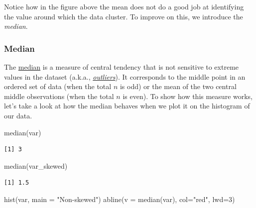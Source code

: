 \documentclass[
  letterpaper,
  DIV=11,
  numbers=noendperiod]{scrartcl}
\newenvironment{Shaded}{\begin{snugshade}}{\end{snugshade}}
\newcommand{\AttributeTok}[1]{\textcolor[rgb]{0.40,0.45,0.13}{#1}}
\newcommand{\DecValTok}[1]{\textcolor[rgb]{0.68,0.00,0.00}{#1}}
\newcommand{\FunctionTok}[1]{\textcolor[rgb]{0.28,0.35,0.67}{#1}}
\newcommand{\NormalTok}[1]{\textcolor[rgb]{0.00,0.23,0.31}{#1}}
\newcommand{\StringTok}[1]{\textcolor[rgb]{0.13,0.47,0.30}{#1}}
\begin{document}
Notice how in the figure above the mean does not do a good job at
identifying the value around which the data cluster. To improve on this,
we introduce the \emph{median}.

\subsubsection{Median}\label{median}

The
\href{https://www.khanacademy.org/math/statistics-probability/summarizing-quantitative-data/mean-median-basics/a/mean-median-and-mode-review\#:~:text=Median\%3A\%20The\%20middle\%20number\%3B\%20found,mean\%20of\%20those\%20two\%20numbers}{median}
is a measure of central tendency that is not sensitive to extreme values
in the dataset (a.k.a.,
\href{https://en.wikipedia.org/wiki/Outlier}{\emph{outliers}}). It
corresponds to the middle point in an ordered set of data (when the
total \(n\) is odd) or the mean of the two central middle observations
(when the total \(n\) is even). To show how this measure works, let's
take a look at how the median behaves when we plot it on the histogram
of our data.

\begin{Shaded}
\begin{Highlighting}[]
\FunctionTok{median}\NormalTok{(var)}
\end{Highlighting}
\end{Shaded}

\begin{verbatim}
[1] 3
\end{verbatim}

\begin{Shaded}
\begin{Highlighting}[]
\FunctionTok{median}\NormalTok{(var\_skewed)}
\end{Highlighting}
\end{Shaded}

\begin{verbatim}
[1] 1.5
\end{verbatim}

\begin{Shaded}
\begin{Highlighting}[]
\FunctionTok{hist}\NormalTok{(var, }\AttributeTok{main =} \StringTok{"Non{-}skewed"}\NormalTok{)}
\FunctionTok{abline}\NormalTok{(}\AttributeTok{v =} \FunctionTok{median}\NormalTok{(var), }\AttributeTok{col=}\StringTok{"red"}\NormalTok{, }\AttributeTok{lwd=}\DecValTok{3}\NormalTok{)}
\end{Highlighting}
\end{Shaded}
\end{document}
